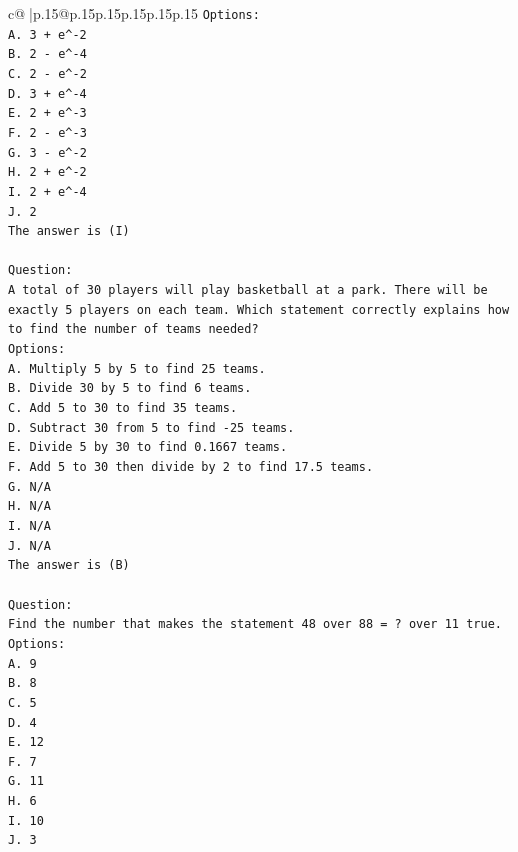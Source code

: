 \documentclass{article}
\begin{document}
{\begin{supertabular}{c@{$\;$}|p{.15\linewidth}@{}p{.15\linewidth}p{.15\linewidth}p{.15\linewidth}p{.15\linewidth}p{.15\linewidth}}
{{{\texttt{Options:} \\
\texttt{A. 3 + e\^{}{-}2} \\
\texttt{B. 2 {-} e\^{}{-}4} \\
\texttt{C. 2 {-} e\^{}{-}2} \\
\texttt{D. 3 + e\^{}{-}4} \\
\texttt{E. 2 + e\^{}{-}3} \\
\texttt{F. 2 {-} e\^{}{-}3} \\
\texttt{G. 3 {-} e\^{}{-}2} \\
\texttt{H. 2 + e\^{}{-}2} \\
\texttt{I. 2 + e\^{}{-}4} \\
\texttt{J. 2} \\
\texttt{The answer is (I)} \\
\\ 
\texttt{Question:} \\
\texttt{A total of 30 players will play basketball at a park. There will be exactly 5 players on each team. Which statement correctly explains how to find the number of teams needed?} \\
\texttt{Options:} \\
\texttt{A. Multiply 5 by 5 to find 25 teams.} \\
\texttt{B. Divide 30 by 5 to find 6 teams.} \\
\texttt{C. Add 5 to 30 to find 35 teams.} \\
\texttt{D. Subtract 30 from 5 to find {-}25 teams.} \\
\texttt{E. Divide 5 by 30 to find 0.1667 teams.} \\
\texttt{F. Add 5 to 30 then divide by 2 to find 17.5 teams.} \\
\texttt{G. N/A} \\
\texttt{H. N/A} \\
\texttt{I. N/A} \\
\texttt{J. N/A} \\
\texttt{The answer is (B)} \\
\\ 
\texttt{Question:} \\
\texttt{Find the number that makes the statement 48 over 88 = ? over 11 true.} \\
\texttt{Options:} \\
\texttt{A. 9} \\
\texttt{B. 8} \\
\texttt{C. 5} \\
\texttt{D. 4} \\
\texttt{E. 12} \\
\texttt{F. 7} \\
\texttt{G. 11} \\
\texttt{H. 6} \\
\texttt{I. 10} \\
\texttt{J. 3} \\
            }
        }
    }
     \\ \\


\end{supertabular}}
\end{document}
